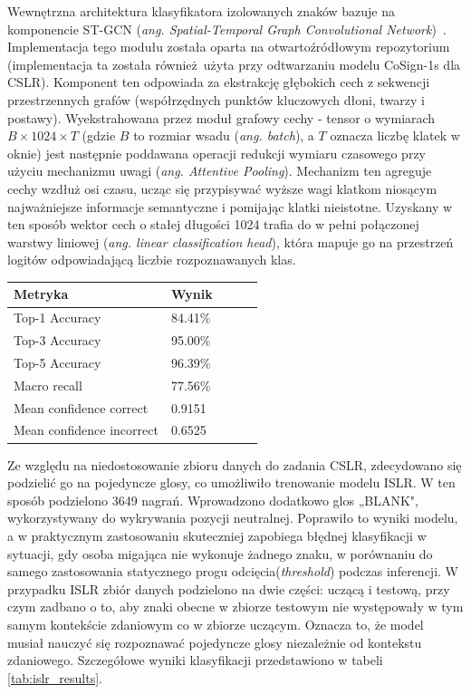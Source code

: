\documentclass[12pt]{article}
\begin{document}
Wewnętrzna architektura klasyfikatora izolowanych znaków bazuje na komponencie ST-GCN (\textit{ang. Spatial-Temporal Graph Convolutional Network})~\cite{stgcn-paper}. Implementacja tego modułu została oparta na otwartoźródłowym repozytorium~\cite{stgcn-repo} (implementacja ta została również użyta przy odtwarzaniu modelu CoSign-1s dla CSLR). Komponent ten odpowiada za ekstrakcję głębokich cech z sekwencji przestrzennych grafów (współrzędnych punktów kluczowych dłoni, twarzy i postawy). Wyekstrahowana przez moduł grafowy cechy - tensor o wymiarach $B \times 1024 \times T$ (gdzie $B$ to rozmiar wsadu (\textit{ang. batch}), a $T$ oznacza liczbę klatek w oknie) jest następnie poddawana operacji redukcji wymiaru czasowego przy użyciu mechanizmu uwagi (\textit{ang. Attentive Pooling}). Mechanizm ten agreguje cechy wzdłuż osi czasu, ucząc się przypisywać wyższe wagi klatkom niosącym najważniejsze informacje semantyczne i pomijając klatki nieistotne. Uzyskany w ten sposób wektor cech o stałej długości 1024 trafia do w pełni połączonej warstwy liniowej (\textit{ang. linear classification head}), która mapuje go na przestrzeń logitów odpowiadającą liczbie rozpoznawanych klas.

\begin{table}[ht]
\centering
\label{tab:train_res_cosign}
\begin{tabular}{llccc}
\toprule
Metryka & Wynik\\
\midrule
Top-1 Accuracy  & 84.41\% \\
Top-3 Accuracy  & 95.00\% \\
Top-5 Accuracy  & 96.39\% \\
Macro recall& 77.56\% \\
Mean confidence correct   & 0.9151 \\
Mean confidence incorrect & 0.6525 \\
\bottomrule
\end{tabular}
\end{table}

Ze względu na niedostosowanie zbioru danych do zadania CSLR, zdecydowano się podzielić go na pojedyncze glosy, co umożliwiło trenowanie modelu ISLR. W ten sposób podzielono 3649 nagrań.
Wprowadzono dodatkowo glos „BLANK", wykorzystywany do wykrywania pozycji neutralnej. Poprawiło to wyniki modelu, a w praktycznym zastosowaniu skuteczniej zapobiega błędnej klasyfikacji w sytuacji, gdy osoba migająca nie wykonuje żadnego znaku, w porównaniu do samego zastosowania statycznego progu odcięcia(\textit{threshold}) podczas inferencji.
W przypadku ISLR zbiór danych podzielono na dwie części: uczącą i testową, przy czym zadbano o to, aby znaki obecne w zbiorze testowym nie występowały w tym samym kontekście zdaniowym co w zbiorze uczącym. 
Oznacza to, że model musiał nauczyć się rozpoznawać pojedyncze glosy niezależnie od kontekstu zdaniowego. Szczegółowe wyniki klasyfikacji przedstawiono w tabeli \ref{tab:islr_results}.
\end{document}
